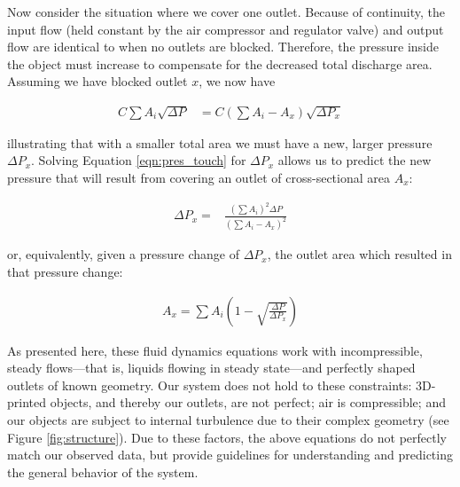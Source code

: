 				Now consider the situation where we cover one outlet. Because of
				continuity, the input flow (held constant by the air compressor and
				regulator valve) and output flow are identical to when no outlets are
				blocked. Therefore, the pressure inside the object must increase to
				compensate for the decreased total discharge area. Assuming we have
				blocked outlet $x$, we now have

				\begin{align}
					C\sum A_i \sqrt{\Delta P} &= C\left( \sum A_i - A_x \right) \sqrt{\Delta P_x}
					\label{eqn:pres_touch}
				\end{align}

				illustrating that with a smaller total area we must have a new, larger
				pressure $\Delta P_x$. Solving Equation \ref{eqn:pres_touch} for $\Delta P_x$
				allows us to predict the new pressure that will result from covering an
				outlet of cross-sectional area $A_x$:

				\begin{align}
					\Delta P_x =& \frac{(\sum A_i)^2 \Delta P}{(\sum A_i - A_x)^2}
					\label{eqn:pressure-from-area}
				\end{align}

				or, equivalently, given a pressure change of $\Delta P_x$, the outlet area
				which resulted in that pressure change:

				\begin{align}
					A_x = \sum A_i \left(1 - \sqrt{\frac{\Delta P}{\Delta P_x}} \right)
					\label{eqn:area-from-pressure}
				\end{align}
				
				As presented here, these fluid dynamics equations work with
				incompressible, steady flows---that is, liquids flowing in steady
				state---and perfectly shaped outlets of known geometry. Our system does
				not hold to these constraints: 3D-printed objects, and thereby our
				outlets, are not perfect; air is compressible; and our objects are subject
				to internal turbulence due to their complex geometry (see
				Figure \ref{fig:structure}). Due to these factors, the above equations do not
				perfectly match our observed data, but provide guidelines for
				understanding and predicting the general behavior of the system.

